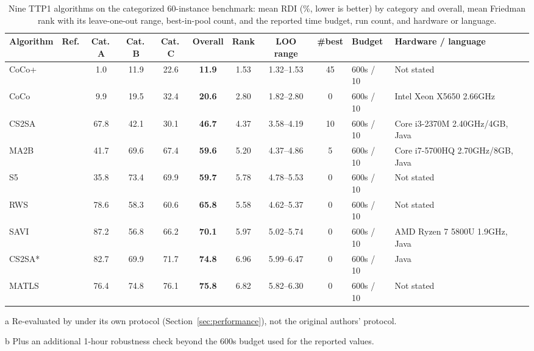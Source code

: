 \begin{table}[htbp]
\centering
\scriptsize
\setlength{\tabcolsep}{3pt}
\begin{threeparttable}
\caption{Nine TTP1 algorithms on the categorized 60-instance benchmark: mean RDI (\%, lower is better) by category and overall, mean Friedman rank with its leave-one-out range, best-in-pool count, and the reported time budget, run count, and hardware or language.}
\label{tab:rdi}
\begin{tabular}{@{}llccccccclp{2.9cm}@{}}
\toprule
\textbf{Algorithm} & \textbf{Ref.} & \textbf{Cat.\,A} & \textbf{Cat.\,B} & \textbf{Cat.\,C} & \textbf{Overall} & \textbf{Rank} & \textbf{LOO range} & \textbf{\#best} & \textbf{Budget} & \textbf{Hardware / language} \\
\midrule
CoCo+ & \citet{namazi2023solving} & 1.0 & 11.9 & 22.6 & \textbf{11.9} & 1.53 & 1.32--1.53 & 45 & 600s\tnote{b} / 10 & Not stated \\
CoCo & \citet{namazi2019cooperative} & 9.9 & 19.5 & 32.4 & \textbf{20.6} & 2.80 & 1.82--2.80 & 0 & 600s / 10 & Intel Xeon X5650 2.66GHz \\
CS2SA & \citet{el2016population} & 67.8 & 42.1 & 30.1 & \textbf{46.7} & 4.37 & 3.58--4.19 & 10 & 600s / 10 & Core i3-2370M 2.40GHz/4GB, Java \\
MA2B & \citet{el2016population} & 41.7 & 69.6 & 67.4 & \textbf{59.6} & 5.20 & 4.37--4.86 & 5 & 600s / 10 & Core i7-5700HQ 2.70GHz/8GB, Java \\
S5 & \citet{faulkner2015approximate}\tnote{a} & 35.8 & 73.4 & 69.9 & \textbf{59.7} & 5.78 & 4.78--5.53 & 0 & 600s / 10 & Not stated \\
RWS & \citet{zhang2021solving} & 78.6 & 58.3 & 60.6 & \textbf{65.8} & 5.58 & 4.62--5.37 & 0 & 600s / 10 & Not stated \\
SAVI & \citet{nguyen2023simulated} & 87.2 & 56.8 & 66.2 & \textbf{70.1} & 5.97 & 5.02--5.74 & 0 & 600s / 10 & AMD Ryzen 7 5800U 1.9GHz, Java \\
CS2SA* & \citet{el2018efficiently} & 82.7 & 69.9 & 71.7 & \textbf{74.8} & 6.96 & 5.99--6.47 & 0 & 600s / 10 & Java \\
MATLS & \citet{mei2014improving}\tnote{a} & 76.4 & 74.8 & 76.1 & \textbf{75.8} & 6.82 & 5.82--6.30 & 0 & 600s / 10 & Not stated \\
\bottomrule
\end{tabular}
\begin{tablenotes}
\footnotesize
\item[a] Re-evaluated by \citet{zhang2021solving} under its own protocol (Section~\ref{sec:performance}), not the original authors' protocol.
\item[b] Plus an additional 1-hour robustness check beyond the 600s budget used for the reported values.
\end{tablenotes}
\end{threeparttable}
\end{table}
